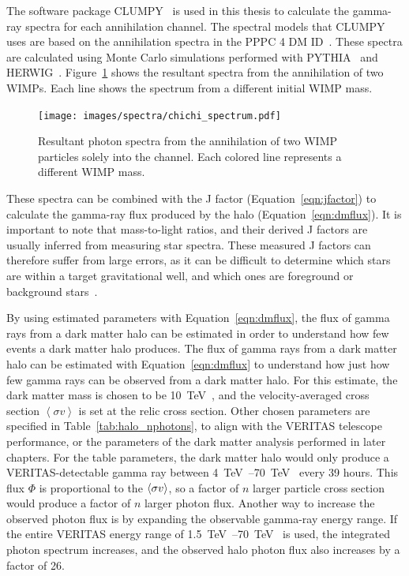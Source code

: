     The software package CLUMPY~\cite{CLUMPYcode} is used in this thesis to calculate the gamma-ray spectra for each annihilation channel.
    The spectral models that CLUMPY uses are based on the annihilation spectra in the PPPC 4 DM ID~\cite{pppc4_dm_spectra,pppc4_ewcorrections}.
    These spectra are calculated using Monte Carlo simulations performed with PYTHIA~\cite{pythia} and HERWIG~\cite{herwig}.
    Figure~\ref{fig:chichi_spectrum} shows the resultant spectra from the annihilation of two WIMPs.
    Each line shows the spectrum from a different initial WIMP mass.

    \begin{figure}[bt]
      \centering
      \texttt{[image: images/spectra/chichi\_spectrum.pdf]}
      \caption[Single Annihilation Spectra]{
        Resultant photon spectra from the annihilation of two WIMP particles solely into the \bbbar channel.
        Each colored line represents a different WIMP mass.
      }
      \label{fig:chichi_spectrum}
    \end{figure}

    These spectra can be combined with the J factor (Equation~\ref{eqn:jfactor}) to calculate the gamma-ray flux produced by the halo (Equation~\ref{eqn:dmflux}).
    It is important to note that mass-to-light ratios, and their derived J factors are usually inferred from measuring star spectra.
    These measured J factors can therefore suffer from large errors, as it can be difficult to determine which stars are within a target gravitational well, and which ones are foreground or background stars~\cite{segue_jfactor_errors}.
    
    By using estimated parameters with Equation~\ref{eqn:dmflux}, the flux of gamma rays from a dark matter halo can be estimated in order to understand how few events a dark matter halo produces.
    The flux of gamma rays from a dark matter halo can be estimated with Equation~\ref{eqn:dmflux} to understand how just how few gamma rays can be observed from a dark matter halo.
    For this estimate, the dark matter mass is chosen to be \SI{10}{\TeV{}}, and the velocity-averaged cross section $\left < \sigma v \right >$ is set at the relic cross section.
    Other chosen parameters are specified in Table~\ref{tab:halo_nphotons}, to align with the VERITAS telescope performance, or the parameters of the dark matter analysis performed in later chapters.
    For the table parameters, the dark matter halo would only produce a VERITAS-detectable gamma ray between \SIrange{4}{70}{\TeV{}} every 39 hours.
    This flux $\Phi$ is proportional to the $\left < \sigma v \right >$, so a factor of $n$ larger particle cross section would produce a factor of $n$ larger photon flux.
    Another way to increase the observed photon flux is by expanding the observable gamma-ray energy range.
    If the entire VERITAS energy range of \SIrange{1.5}{70}{\TeV{}} is used, the integrated photon spectrum increases, and the observed halo photon flux also increases by a factor of 26.
    
